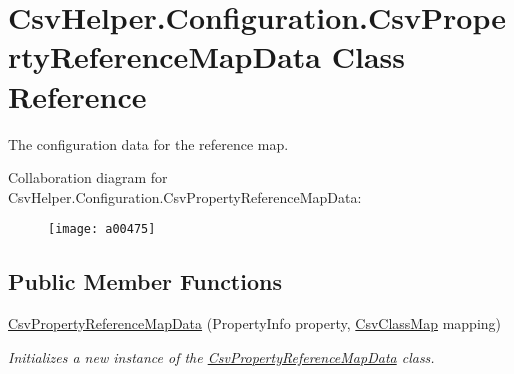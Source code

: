 \hypertarget{a00073}{\section{Csv\-Helper.\-Configuration.\-Csv\-Property\-Reference\-Map\-Data Class Reference}
\label{a00073}
}


The configuration data for the reference map.  




Collaboration diagram for Csv\-Helper.\-Configuration.\-Csv\-Property\-Reference\-Map\-Data\-:
\nopagebreak
\begin{figure}[H]
\begin{center}
\leavevmode
\texttt{[image: a00475]}
\end{center}
\end{figure}
\subsection*{Public Member Functions}
\begin{DoxyCompactItemize}
\item 
\hyperlink{a00073_ad6fe2913932a9fe434f8a908dec30e8b}{Csv\-Property\-Reference\-Map\-Data} (Property\-Info property, \hyperlink{a00057}{Csv\-Class\-Map} mapping)
\begin{DoxyCompactList}\small\item\em Initializes a new instance of the \hyperlink{a00073}{Csv\-Property\-Reference\-Map\-Data} class. \end{DoxyCompactList}\end{DoxyCompactItemize}
